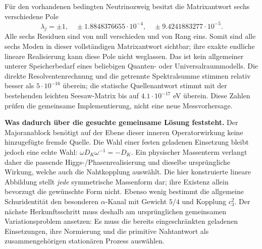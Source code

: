 Für den vorhandenen bedingten Neutrinozweig besitzt die Matrixantwort sechs
verschiedene Pole
\begin{equation}
\lambda_j=\pm1,\quad
\pm1.8848376655\cdot10^{-4},\quad
\pm9.4241883277\cdot10^{-5}.
\end{equation}
Alle sechs Residuen sind von null verschieden und von Rang eins. Somit sind
alle sechs Moden in dieser vollständigen Matrixantwort sichtbar; ihre
exakte endliche lineare Realisierung kann diese Pole nicht weglassen.
Das ist kein allgemeiner unterer Speicherbedarf eines beliebigen
Quanten- oder Universalraummodells. Die direkte Resolventenrechnung und
die getrennte Spektralsumme stimmen relativ besser als $5\cdot10^{-16}$
überein; die statische Quellenantwort stimmt mit der bestehenden leichten
Seesaw-Matrix bis auf $4.1\cdot10^{-17}$ eV überein.
Diese Zahlen prüfen die gemeinsame Implementierung, nicht eine neue
Messvorhersage.


\textbf{Was dadurch über die gesuchte gemeinsame Lösung feststeht.}
Der Majoranablock benötigt auf der Ebene dieser inneren Operatorwirkung
keine hinzugefügte fremde Quelle. Die Wahl einer festen geladenen
Einsetzung bleibt jedoch eine echte Wahl:
$\omega D_K\omega^{-1}=-D_K$. Ein physischer Massenterm verlangt daher
die passende Higgs-/Phasenrealisierung und dieselbe ursprüngliche
Wirkung, welche auch die Nahtkopplung auswählt. Die hier konstruierte
lineare Abbildung stellt \emph{jede} symmetrische Massenform dar; ihre
Existenz allein bevorzugt die gewünschte Form nicht.
Ebenso wenig bestimmt die allgemeine Schuridentität den besonderen
$\alpha$-Kanal mit Gewicht $5/4$ und Kopplung $c_3^2$.
Der nächste Herkunftsschritt muss deshalb am ursprünglichen gemeinsamen
Variationsproblem ansetzen: Es muss die bereits eingeschränkten
geladenen Einsetzungen, ihre Normierung und die primitive Nahtantwort
als zusammengehörigen stationären Prozess auswählen.


